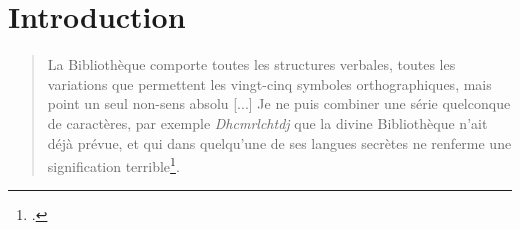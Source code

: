 \chapter{Introduction}	

\begin{quote}
    \og La Bibliothèque comporte toutes les structures verbales, toutes les variations que permettent les vingt-cinq symboles orthographiques, mais point un seul non-sens absolu [...] Je ne puis combiner une série quelconque de caractères, par exemple	\textit{Dhcmrlchtdj} que la divine Bibliothèque n’ait déjà prévue, et qui dans quelqu'une de ses langues secrètes ne renferme
	une signification terrible\footcite{borgesBibliothequeBabel1963}.\fg
\end{quote}